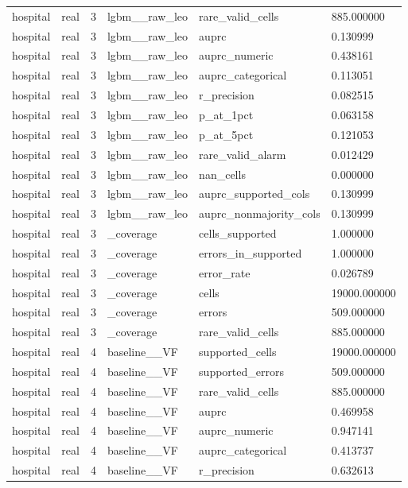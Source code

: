\begin{tabular}{llllll}
hospital & real & 3 & lgbm\_\_raw\_leo & rare\_valid\_cells & 885.000000 \\
hospital & real & 3 & lgbm\_\_raw\_leo & auprc & 0.130999 \\
hospital & real & 3 & lgbm\_\_raw\_leo & auprc\_numeric & 0.438161 \\
hospital & real & 3 & lgbm\_\_raw\_leo & auprc\_categorical & 0.113051 \\
hospital & real & 3 & lgbm\_\_raw\_leo & r\_precision & 0.082515 \\
hospital & real & 3 & lgbm\_\_raw\_leo & p\_at\_1pct & 0.063158 \\
hospital & real & 3 & lgbm\_\_raw\_leo & p\_at\_5pct & 0.121053 \\
hospital & real & 3 & lgbm\_\_raw\_leo & rare\_valid\_alarm & 0.012429 \\
hospital & real & 3 & lgbm\_\_raw\_leo & nan\_cells & 0.000000 \\
hospital & real & 3 & lgbm\_\_raw\_leo & auprc\_supported\_cols & 0.130999 \\
hospital & real & 3 & lgbm\_\_raw\_leo & auprc\_nonmajority\_cols & 0.130999 \\
hospital & real & 3 & \_coverage & cells\_supported & 1.000000 \\
hospital & real & 3 & \_coverage & errors\_in\_supported & 1.000000 \\
hospital & real & 3 & \_coverage & error\_rate & 0.026789 \\
hospital & real & 3 & \_coverage & cells & 19000.000000 \\
hospital & real & 3 & \_coverage & errors & 509.000000 \\
hospital & real & 3 & \_coverage & rare\_valid\_cells & 885.000000 \\
hospital & real & 4 & baseline\_\_VF & supported\_cells & 19000.000000 \\
hospital & real & 4 & baseline\_\_VF & supported\_errors & 509.000000 \\
hospital & real & 4 & baseline\_\_VF & rare\_valid\_cells & 885.000000 \\
hospital & real & 4 & baseline\_\_VF & auprc & 0.469958 \\
hospital & real & 4 & baseline\_\_VF & auprc\_numeric & 0.947141 \\
hospital & real & 4 & baseline\_\_VF & auprc\_categorical & 0.413737 \\
hospital & real & 4 & baseline\_\_VF & r\_precision & 0.632613 \\

\end{tabular}
